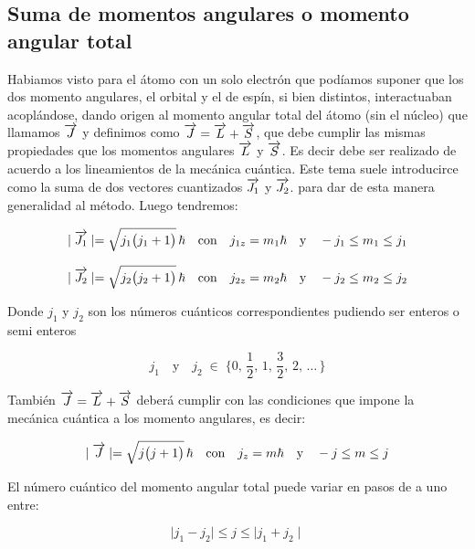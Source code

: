 \subsection{Suma de momentos angulares o momento angular total}

Habiamos visto para el átomo con un solo electrón que podíamos suponer que los dos momento angulares, el orbital y el de espín, si bien distintos, interactuaban acoplándose, dando origen al momento angular total del átomo (sin el núcleo) que llamamos $\overrightarrow{J}$ y definimos como $\overrightarrow{J}=\overrightarrow{L}+\overrightarrow{S}$, que debe cumplir las mismas propiedades que los momentos angulares $\overrightarrow{L}$ y $\overrightarrow{S}$. Es decir debe ser realizado de acuerdo a los lineamientos de la mecánica cuántica. Este tema suele introducirce como la suma de dos vectores cuantizados $\overrightarrow{J_{1}}$ y $\overrightarrow{J_{2}}$. para dar de esta manera generalidad al método. Luego tendremos:


\begin{equation}
	\mid\overrightarrow{J_{1}}\mid =\sqrt{j_{1}\big(j_{1}+1\big)}\,\hbar \quad \text{con} \quad j_{1z}= m_{1}\hbar \quad \text{y} \quad -j_{1} \leq m_{1} \leq j_{1}
\end{equation}

\begin{equation}
	\mid\overrightarrow{J_{2}}\mid =\sqrt{j_{2}\big(j_{2}+1\big)}\,\hbar \quad \text{con} \quad j_{2z}= m_{2}\hbar \quad \text{y} \quad -j_{2} \leq m_{2} \leq j_{2}
\end{equation}

%

Donde $j_{1}$ y $j_{2}$ son los números cuánticos correspondientes pudiendo ser enteros o semi enteros

\begin{equation}
	j_{1} \quad \text{y} \quad j_{2} \; \in \; \lbrace 0,\, \frac{1}{2},\, 1,\, \frac{3}{2},\, 2,\, \ldots\, \rbrace
\end{equation}

También $\overrightarrow{J}=\overrightarrow{L}+\overrightarrow{S}$ deberá cumplir con las condiciones que impone la mecánica cuántica a los momento angulares, es decir:

\begin{equation}
	\mid\overrightarrow{J}\mid =\sqrt{j\big(j+1\big)}\,\hbar \quad \text{con} \quad j_{z}= m\hbar \quad \text{y} \quad -j \leq m \leq j
\end{equation}

El número cuántico del momento angular total puede variar en pasos de a uno entre:

\begin{equation}
	\mid j_{1}-j_{2} \mid \leq j \leq \mid j_{1}+j_{2} \mid
\end{equation}

